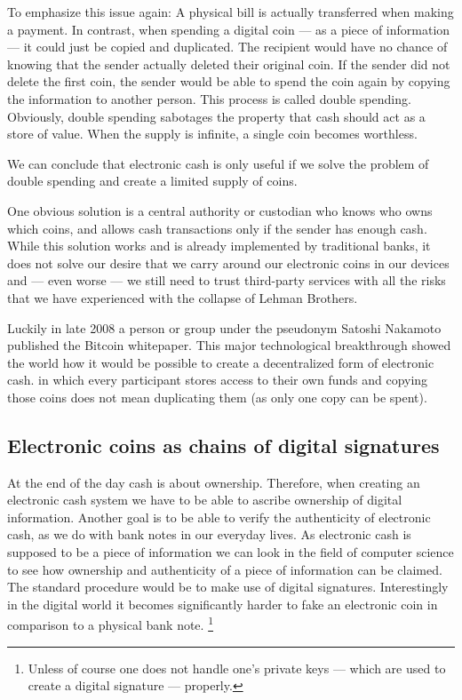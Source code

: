 \documentclass[a4paper,12pt,oneside,openany]{book}
\begin{document}
To emphasize this issue again: A physical bill is actually transferred when making a payment. In contrast, when spending a digital coin --- as a piece of information --- it could just be copied and duplicated.
The recipient would have no chance of knowing that the sender actually deleted their original coin.
If the sender did not delete the first coin, the sender would be able to spend the coin again by copying the information to another person.
This process is called double spending.
Obviously, double spending sabotages the property that cash should act as a store of value. When the supply is infinite, a single coin becomes worthless. 

We can conclude that electronic cash is only useful if we solve the problem of double spending and create a limited supply of coins.

One obvious solution is a central authority or custodian who knows who owns which coins, and allows cash transactions only if the sender has enough cash.
While this solution works and is already implemented by traditional banks, it does not solve our desire that we carry around our electronic coins in our devices and --- even worse --- we still need to trust third-party services with all the risks that we have experienced with the collapse of Lehman Brothers.


Luckily in late 2008 a person or group under the pseudonym Satoshi Nakamoto published the Bitcoin whitepaper.
This major technological breakthrough showed the world how it would be possible to create a decentralized form of electronic cash.
in which every participant stores access to their own funds and copying those coins does not mean duplicating them (as only one copy can be spent).


\subsection{Electronic coins as chains of digital signatures}
At the end of the day cash is about ownership.
Therefore, when creating an electronic cash system we have to be able to ascribe ownership of digital information. 
Another goal is to be able to verify the authenticity of electronic cash, as we do with bank notes in our everyday lives.
As electronic cash is supposed to be a piece of information we can look in the field of computer science to see how ownership and authenticity of a piece of information can be claimed.
The standard procedure would be to make use of \gls{digital signature}s.
Interestingly in the digital world it becomes significantly harder to fake an electronic coin in comparison to a physical bank note.
\footnote{Unless of course one does not handle one's private keys --- which are used to create a digital signature --- properly.}
\end{document}
